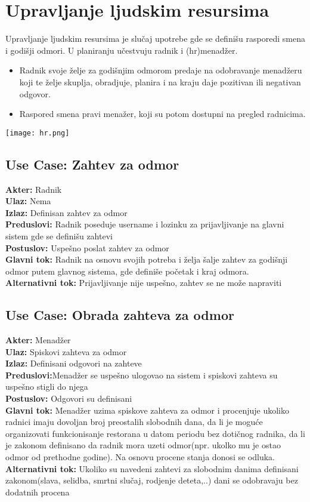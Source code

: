 \documentclass{article}
\begin{document}
\section{Upravljanje ljudskim resursima}
Upravljanje ljudskim resursima je slučaj upotrebe  gde se definišu rasporedi smena i godišji odmori. U planiranju učestvuju radnik i (hr)menadžer.

\begin{itemize}
\item Radnik svoje želje za godišnjim odmorom predaje na odobravanje menadžeru koji te želje skuplja, obradjuje, planira i na kraju daje pozitivan ili negativan odgovor.
\item Raspored smena pravi menažer, koji su potom dostupni na pregled radnicima.
\end{itemize}
\texttt{[image: hr.png]}
\subsection{\textbf{Use Case}: Zahtev za odmor}
\textbf{Akter:} Radnik\\
\textbf{Ulaz:} Nema\\
\textbf{Izlaz:} Definisan zahtev za odmor\\
\textbf{Preduslovi:} Radnik poseduje username i lozinku za prijavljivanje na glavni sistem gde se definišu zahtevi\\
\textbf{Postuslov:} Uspešno poslat zahtev za odmor\\
\textbf{Glavni tok:} Radnik na osnovu svojih potreba i želja šalje zahtev za godišnji odmor putem glavnog sistema, gde definiše početak i kraj odmora.\\
\textbf{Alternativni tok:} Prijavljivanje nije uspešno, zahtev se ne može napraviti\\

\subsection{\textbf{Use Case}: Obrada zahteva za odmor}
\textbf{Akter:} Menadžer\\
\textbf{Ulaz:} Spiskovi zahteva za odmor\\
\textbf{Izlaz:} Definisani odgovori na zahteve\\
\textbf{Preduslovi:}Menadžer se uspešno ulogovao na sistem i spiskovi zahteva su uspešno stigli do njega\\
\textbf{Postuslov:} Odgovori su definisani\\
\textbf{Glavni tok:} Menadžer uzima spiskove zahteva za odmor i procenjuje ukoliko radnici imaju dovoljan broj preostalih slobodnih dana, da li je moguće organizovati funkcionisanje restorana u datom periodu bez dotičnog radnika, da li je zakonom definisano da radnik mora uzeti odmor(npr. ukolko mu je ostao odmor od prethodne godine). Na osnovu procene stanja donosi se odluka.
\textbf{Alternativni tok:} Ukoliko su navedeni zahtevi za slobodnim danima definisani zakonom(slava, selidba, smrtni slučaj, rodjenje deteta,..) dani se odobravaju bez dodatnih procena\\
\end{document}
